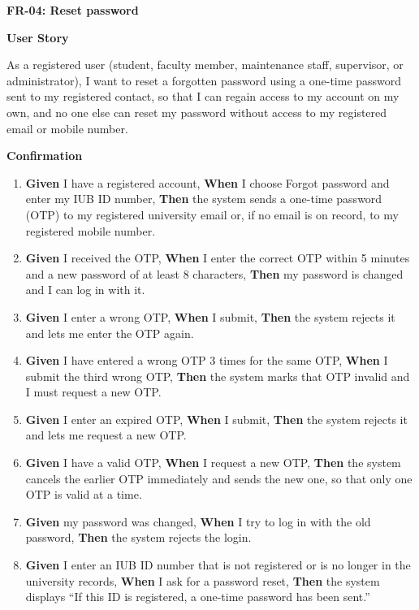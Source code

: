 \noindent\textbf{FR-04: Reset password}\par\nopagebreak[4]\smallskip
\noindent\textbf{User Story}\par\nopagebreak[4]
\noindent As a registered user (student, faculty member, maintenance staff, supervisor, or administrator), I want to reset a forgotten password using a one-time password sent to my registered contact, so that I can regain access to my account on my own, and no one else can reset my password without access to my registered email or mobile number.\par\smallskip
{\makeatletter
{}
\makeatother
\noindent\textbf{Confirmation}\par\nopagebreak[4]\vspace{-6pt}\nopagebreak[4]
\begin{enumerate}\setlength{\itemsep}{2pt}\setlength{\parsep}{0pt}\setlength{\topsep}{2pt}\setlength{\partopsep}{0pt}
  \item \textbf{Given} I have a registered account, \textbf{When} I choose Forgot password and enter my IUB ID number, \textbf{Then} the system sends a one-time password (OTP) to my registered university email or, if no email is on record, to my registered mobile number.
  \item \textbf{Given} I received the OTP, \textbf{When} I enter the correct OTP within 5 minutes and a new password of at least 8 characters, \textbf{Then} my password is changed and I can log in with it.
  \item \textbf{Given} I enter a wrong OTP, \textbf{When} I submit, \textbf{Then} the system rejects it and lets me enter the OTP again.
  \item \textbf{Given} I have entered a wrong OTP 3 times for the same OTP, \textbf{When} I submit the third wrong OTP, \textbf{Then} the system marks that OTP invalid and I must request a new OTP.
  \item \textbf{Given} I enter an expired OTP, \textbf{When} I submit, \textbf{Then} the system rejects it and lets me request a new OTP.
  \item \textbf{Given} I have a valid OTP, \textbf{When} I request a new OTP, \textbf{Then} the system cancels the earlier OTP immediately and sends the new one, so that only one OTP is valid at a time.
  \item \textbf{Given} my password was changed, \textbf{When} I try to log in with the old password, \textbf{Then} the system rejects the login.
  \item \textbf{Given} I enter an IUB ID number that is not registered or is no longer in the university records, \textbf{When} I ask for a password reset, \textbf{Then} the system displays ``If this ID is registered, a one-time password has been sent.''

\end{enumerate}}
